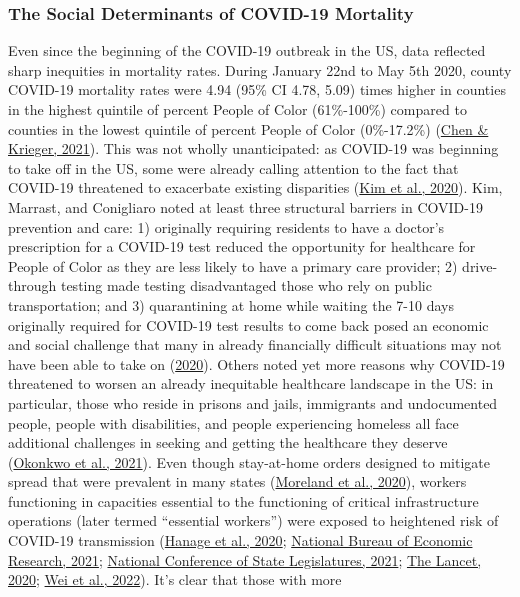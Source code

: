 \documentclass[
]{article}
\begin{document}
\hypertarget{the-social-determinants-of-covid-19-mortality}{%
\subsubsection{The Social Determinants of COVID-19 Mortality}\label{the-social-determinants-of-covid-19-mortality}}

Even since the beginning of the COVID-19 outbreak in the US, data reflected
sharp inequities in mortality rates. During January 22nd to May 5th 2020,
county COVID-19 mortality rates were 4.94 (95\% CI 4.78, 5.09) times higher in
counties in the highest quintile of percent People of Color (61\%-100\%) compared
to counties in the lowest quintile of percent People of Color (0\%-17.2\%)
(\protect\hyperlink{ref-chen_revealing_2021}{Chen \& Krieger, 2021}). This was not wholly unanticipated: as COVID-19 was
beginning to take off in the US, some were already calling attention to the fact
that COVID-19 threatened to exacerbate existing disparities
(\protect\hyperlink{ref-kim_covid-19_2020}{Kim et al., 2020}). Kim, Marrast, and Conigliaro noted at least three structural
barriers in COVID-19 prevention and care: 1) originally requiring
residents to have a doctor's prescription for a COVID-19 test reduced the
opportunity for healthcare for People of Color as they are less likely to have a
primary care provider; 2) drive-through testing made testing disadvantaged those
who rely on public transportation; and 3) quarantining at home while waiting the
7-10 days originally required for COVID-19 test results to come back posed an
economic and social challenge that many in already financially difficult
situations may not have been able to take on (\protect\hyperlink{ref-kim_covid-19_2020}{2020}). Others noted
yet more reasons why COVID-19 threatened to worsen an already inequitable
healthcare landscape in the US: in particular, those who reside in prisons and jails,
immigrants and undocumented people, people with disabilities, and people
experiencing homeless all face additional challenges in seeking and getting the
healthcare they deserve (\protect\hyperlink{ref-okonkwo_covid-19_2021}{Okonkwo et al., 2021}). Even though stay-at-home orders
designed to mitigate spread that were prevalent in many states
(\protect\hyperlink{ref-moreland_timing_2020}{Moreland et al., 2020}), workers functioning in capacities essential to the
functioning of critical infrastructure operations (later termed ``essential
workers'') were exposed to heightened risk of COVID-19 transmission
(\protect\hyperlink{ref-hanage_covid-19_2020}{Hanage et al., 2020}; \protect\hyperlink{ref-national_bureau_of_economic_research_measuring_2021}{National Bureau of Economic Research, 2021}; \protect\hyperlink{ref-national_conference_of_state_legislatures_covid-19_2021}{National Conference of State Legislatures, 2021}; \protect\hyperlink{ref-the_lancet_plight_2020}{The Lancet, 2020}; \protect\hyperlink{ref-wei_risk_2022}{Wei et al., 2022}). It's clear that those with more
\end{document}
